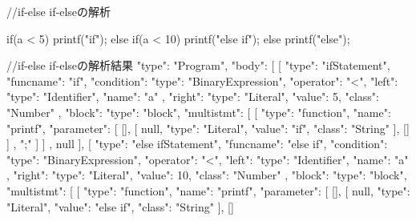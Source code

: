 //if-else if-elseの解析

if(a < 5) {
   printf("if");
}else if(a < 10) {
   printf("else if");
} else {
   printf("else");
}

//if-else if-elseの解析結果
{
   "type": "Program",
   "body": [
      [
         {
            "type": "ifStatement",
            "funcname": "if",
            "condition": {
               "type": "BinaryExpression",
               "operator": "<",
               "left": {
                  "type": "Identifier",
                  "name": "a"
               },
               "right": {
                  "type": "Literal",
                  "value": 5,
                  "class": "Number"
               }
            },
            "block": {
               "type": "block",
               "multistmt": [
                  [
                     {
                        "type": "function",
                        "name": "printf",
                        "parameter": [
                           [],
                           [
                              null,
                              {
                                 "type": "Literal",
                                 "value": "if",
                                 "class": "String"
                              }
                           ],
                           []
                        ]
                     },
                     ";"
                  ]
               ]
            }
         },
         null
      ],
      [
         {
            "type": "else ifStatement",
            "funcname": "else if",
            "condition": {
               "type": "BinaryExpression",
               "operator": "<",
               "left": {
                  "type": "Identifier",
                  "name": "a"
               },
               "right": {
                  "type": "Literal",
                  "value": 10,
                  "class": "Number"
               }
            },
            "block": {
               "type": "block",
               "multistmt": [
                  [
                     {
                        "type": "function",
                        "name": "printf",
                        "parameter": [
                           [],
                           [
                              null,
                              {
                                 "type": "Literal",
                                 "value": "else if",
                                 "class": "String"
                              }
                           ],
                           []
}}}}
